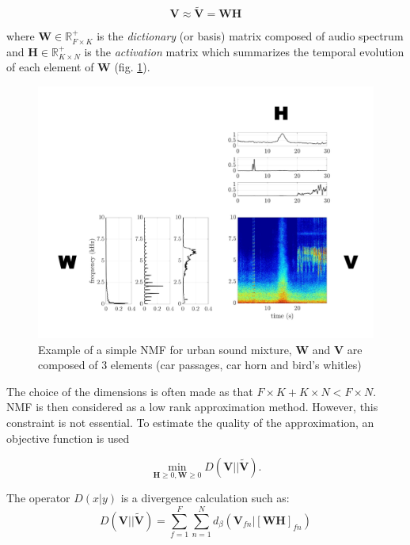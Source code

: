 \documentclass[twocolumn,a4paper,10pt]{article}
\begin{document}
\begin{equation}\label{eq:nmf}
\mathbf{V} \approx \mathbf{\tilde{V}} = \mathbf{WH}
\end{equation}

where $\mathbf{W} \in \mathbb{R}^+_{F \times K}$ is the \textit{dictionary} (or basis) matrix composed of audio spectrum and $\mathbf{H} \in \mathbb{R}^+_{K \times N}$ is the \textit{activation} matrix which summarizes the temporal evolution of each element of $\mathbf{W}$ (fig.  \ref{fig:example_NMF}).

\begin{figure}[t]
\centering
\includegraphics[width=0.9\linewidth]{figures/schema_introduction_nmf.pdf}
\caption{Example of a simple NMF  for urban sound mixture, $\mathbf{W}$ and $\mathbf{V}$ are composed of 3 elements (car passages, car horn and bird's whitles)}
\label{fig:example_NMF}
\end{figure}

The choice of the dimensions is often made as that $F\times K + K \times N < F \times N$. NMF is then considered as a low rank approximation method. However, this constraint is not essential. To estimate the quality of the approximation, an objective function is used

\begin{equation}\label{eq:min-D-WH}
\underset{\mathbf{H} \geq 0, \mathbf{W} \geq 0}{\min} D\left(\mathbf{V} \vert \vert \mathbf{\tilde{V}}\right).
\end{equation}

The operator $D(x\vert y)$ is a divergence calculation such as:
\begin{equation}
D\left(\textbf{V} \vert\vert \mathbf{\tilde{V}} \right) = \sum_{f = 1}^{F} \sum_{n = 1}^{N} d_{\beta}
\left(\textbf{V}_{fn} \vert \left[ \textbf{WH} \right]_{fn} \right)
\end{equation}
\end{document}
